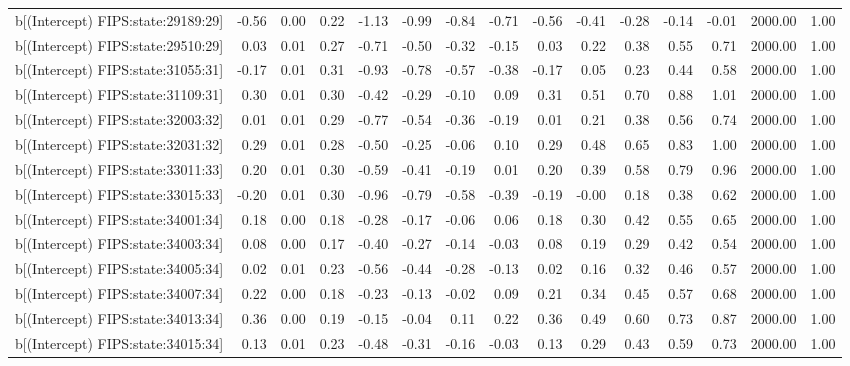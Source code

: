 \begin{table}[ht]
\begin{tabular}{rrrrrrrrrrrrrrr}
  b[(Intercept) FIPS:state:29189:29] & -0.56 & 0.00 & 0.22 & -1.13 & -0.99 & -0.84 & -0.71 & -0.56 & -0.41 & -0.28 & -0.14 & -0.01 & 2000.00 & 1.00 \\ 
  b[(Intercept) FIPS:state:29510:29] & 0.03 & 0.01 & 0.27 & -0.71 & -0.50 & -0.32 & -0.15 & 0.03 & 0.22 & 0.38 & 0.55 & 0.71 & 2000.00 & 1.00 \\ 
  b[(Intercept) FIPS:state:31055:31] & -0.17 & 0.01 & 0.31 & -0.93 & -0.78 & -0.57 & -0.38 & -0.17 & 0.05 & 0.23 & 0.44 & 0.58 & 2000.00 & 1.00 \\ 
  b[(Intercept) FIPS:state:31109:31] & 0.30 & 0.01 & 0.30 & -0.42 & -0.29 & -0.10 & 0.09 & 0.31 & 0.51 & 0.70 & 0.88 & 1.01 & 2000.00 & 1.00 \\ 
  b[(Intercept) FIPS:state:32003:32] & 0.01 & 0.01 & 0.29 & -0.77 & -0.54 & -0.36 & -0.19 & 0.01 & 0.21 & 0.38 & 0.56 & 0.74 & 2000.00 & 1.00 \\ 
  b[(Intercept) FIPS:state:32031:32] & 0.29 & 0.01 & 0.28 & -0.50 & -0.25 & -0.06 & 0.10 & 0.29 & 0.48 & 0.65 & 0.83 & 1.00 & 2000.00 & 1.00 \\ 
  b[(Intercept) FIPS:state:33011:33] & 0.20 & 0.01 & 0.30 & -0.59 & -0.41 & -0.19 & 0.01 & 0.20 & 0.39 & 0.58 & 0.79 & 0.96 & 2000.00 & 1.00 \\ 
  b[(Intercept) FIPS:state:33015:33] & -0.20 & 0.01 & 0.30 & -0.96 & -0.79 & -0.58 & -0.39 & -0.19 & -0.00 & 0.18 & 0.38 & 0.62 & 2000.00 & 1.00 \\ 
  b[(Intercept) FIPS:state:34001:34] & 0.18 & 0.00 & 0.18 & -0.28 & -0.17 & -0.06 & 0.06 & 0.18 & 0.30 & 0.42 & 0.55 & 0.65 & 2000.00 & 1.00 \\ 
  b[(Intercept) FIPS:state:34003:34] & 0.08 & 0.00 & 0.17 & -0.40 & -0.27 & -0.14 & -0.03 & 0.08 & 0.19 & 0.29 & 0.42 & 0.54 & 2000.00 & 1.00 \\ 
  b[(Intercept) FIPS:state:34005:34] & 0.02 & 0.01 & 0.23 & -0.56 & -0.44 & -0.28 & -0.13 & 0.02 & 0.16 & 0.32 & 0.46 & 0.57 & 2000.00 & 1.00 \\ 
  b[(Intercept) FIPS:state:34007:34] & 0.22 & 0.00 & 0.18 & -0.23 & -0.13 & -0.02 & 0.09 & 0.21 & 0.34 & 0.45 & 0.57 & 0.68 & 2000.00 & 1.00 \\ 
  b[(Intercept) FIPS:state:34013:34] & 0.36 & 0.00 & 0.19 & -0.15 & -0.04 & 0.11 & 0.22 & 0.36 & 0.49 & 0.60 & 0.73 & 0.87 & 2000.00 & 1.00 \\ 
  b[(Intercept) FIPS:state:34015:34] & 0.13 & 0.01 & 0.23 & -0.48 & -0.31 & -0.16 & -0.03 & 0.13 & 0.29 & 0.43 & 0.59 & 0.73 & 2000.00 & 1.00 \\ 

\end{tabular}
\end{table}
